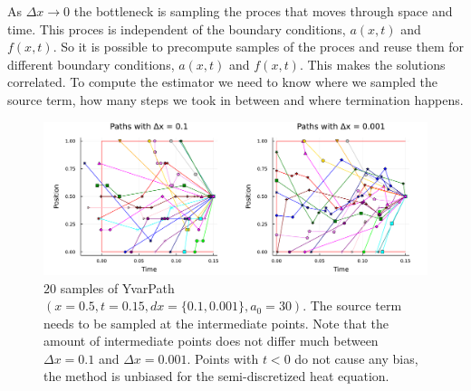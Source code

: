\documentclass[a4paper,12pt]{article}
\begin{document}
\begin{technique}
  As $\Delta x \rightarrow 0$ the bottleneck is sampling the proces that moves through space and time.
  This proces is independent of the boundary conditions, $a(x,t)$ and $f(x,t)$. So it is possible to
  precompute samples of the proces and reuse them for different boundary conditions, $a(x,t)$ and $f(x,t)$.
  This makes the solutions correlated. To compute the estimator we need to know where we sampled the
  source term, how many steps we took in between and where termination happens.


  \begin{figure}[h!]
    \centering
    \includegraphics[width=\textwidth]{./julia_plots/paths_pest_heat_varcoef.pdf}
    \caption{$20$ samples of YvarPath$(x=0.5,t=0.15,dx=\{0.1,0.001\},a_{0}=30)$. The source term needs to be sampled
    at the intermediate points. Note that the amount of
    intermediate points does not differ much between $\Delta x = 0.1$ and $\Delta x = 0.001$.
    Points with $t<0$ do not cause any bias, the method is unbiased for the semi-discretized heat equation. }
    \label{fig:presampled paths pest heat var}
  \end{figure}

\end{technique}





\end{document}
